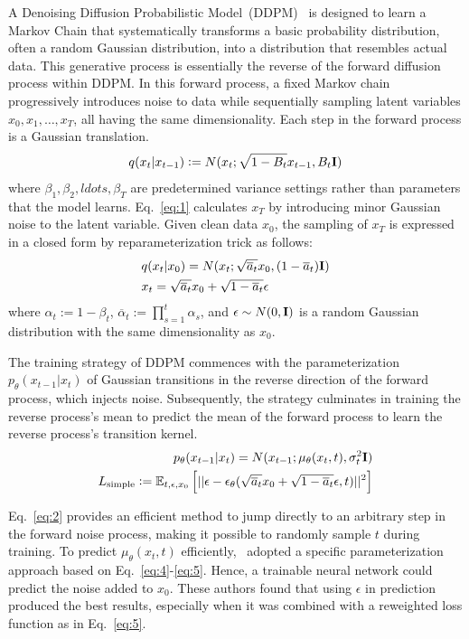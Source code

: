 \documentclass[runningheads]{llncs}
\begin{document}
A Denoising Diffusion Probabilistic Model~(DDPM)~\cite{17} is designed to
learn a Markov Chain that systematically transforms a basic probability distribution, often a random Gaussian distribution, into a distribution that resembles actual data. This generative process is essentially the reverse of the forward diffusion process within DDPM. In this forward process, a fixed Markov chain progressively introduces noise to data while sequentially sampling latent variables $x_0, x_1, \ldots, x_T$, all having the same dimensionality. Each step in the forward process is a Gaussian translation.
%
\begin{equation}\label{eq:1}
q(x_t | x_{t-1}) := N(x_t; \sqrt{1-B_t} x_{t-1}, B_{t}\bf{I})
\end{equation}
%
where $\beta_1, \beta_2, ldots, \beta_T$ are predetermined variance settings rather than parameters that the model learns. Eq.~\eqref{eq:1} calculates $x_T$ by introducing minor Gaussian noise to the latent variable. Given clean data $x_0$, the sampling of $x_T$ is expressed in a closed form by reparameterization trick as follows:
%
\begin{align}
 & q(x_t | x_{0}) = N(x_t; \sqrt{\overline{a}_t} x_0, (1-\overline{a}_t) \bf{I}) \label{eq:2} \\
& x_t = \sqrt{\overline{a}_t} x_0 + \sqrt{1-\overline{a}_t} \epsilon \label{eq:3}
\end{align}
%
where $\alpha_t := 1-\beta_t$, $\overline{\alpha}_t := \prod_{s=1}^{t} \alpha_s$, and $\epsilon \sim N(0, \bf{I})$ is a random Gaussian distribution with the same dimensionality as $x_0$.

The training strategy of DDPM commences with the parameterization $p_{\theta}(x_{t-1} | x_t)$ of Gaussian transitions in the reverse direction of the forward process, which injects noise. Subsequently, the strategy culminates in training the reverse process's mean to predict the mean of the forward process to learn the reverse process's transition kernel.
%
\begin{align}
p_{\theta}(x_{t-1} | x_t) = N(x_{t-1};   \mu_{\theta}(x_t, t),
  \sigma_{t}^2 \bf{I}) \label{eq:4} \\
L_{\text{simple}} :=  \mathbb{E}_{t, \epsilon, x_0} \left[ || \epsilon - \epsilon_{\theta} (\sqrt{\overline{a}_t} x_0 +
  \sqrt{1-\overline{a}_t} \epsilon, t) ||^2 \right] \label{eq:5}
\end{align}

Eq.~\eqref{eq:2} provides an efficient method to jump directly to an
arbitrary step in the forward noise process, making it possible to
randomly sample $t$ during training. To predict $\mu_{\theta}(x_t, t)$
efficiently,~\cite{17} adopted a specific parameterization
approach based on Eq.~\eqref{eq:4}-\eqref{eq:5}. Hence, a trainable neural
network could predict the noise added to $x_0$. These authors found that
using $\epsilon$ in prediction produced the best results, especially
when it was combined with a reweighted loss function as in Eq.~\eqref{eq:5}.
\end{document}
